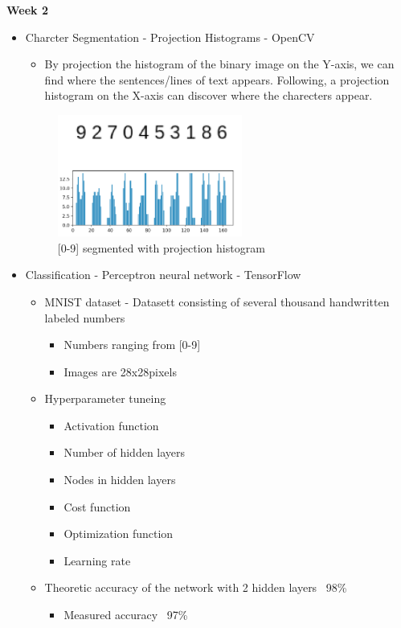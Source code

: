 \documentclass[11pt,a4paper,english]{article}
\newenvironment{loggentry}[2]%
{\noindent\textbf{#2}\marginnote{#1}\\}{\vspace{0.5cm}}
\begin{document}
\newpage
\begin{loggentry}{26.04.18}{Week 2}
\begin{itemize}
  \item{Charcter Segmentation - Projection Histograms - OpenCV}
  \begin{itemize}
    \item{By projection the histogram of the binary image on the Y-axis,
    we can find where the sentences/lines of text appears. Following, a
    projection histogram on the X-axis can discover where the charecters
    appear.}
  \end{itemize}

  \begin{figure}[H]
    \centering
    \includegraphics[height=4cm]{res/0-9_segmented_out.png}
    \caption{[0-9] segmented with projection histogram}
    \label{fig:0-9_segmented_out}
  \end{figure}

  \item{Classification - Perceptron neural network - TensorFlow}
    \begin{itemize}
      \item{MNIST dataset - Datasett consisting of several thousand handwritten
      labeled numbers}
      \begin{itemize}
        \item{Numbers ranging from [0-9]}
        \item{Images are 28x28pixels}
      \end{itemize}
      \item{Hyperparameter tuneing}
      \begin{itemize}
        \item{Activation function}
        \item{Number of hidden layers}
        \item{Nodes in hidden layers}
        \item{Cost function}
        \item{Optimization function}
        \item{Learning rate}
      \end{itemize}
      \item{Theoretic accuracy of the network with 2 hidden layers ~98\%}
      \begin{itemize}
        \item{Measured accuracy ~97\%}


\end{itemize}
\end{itemize}
\end{itemize}
\end{loggentry}
\end{document}
